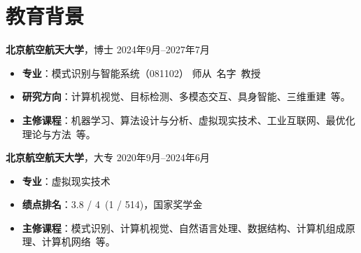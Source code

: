 \documentclass[11pt]{article}
\newlength{\iconwidth}
\begin{document}
    \begin{minipage}[t]{\textwidth}
        \begin{minipage}[t]{\textwidth}
        \section[教育背景]{\makebox[\iconwidth][c]{\color{primary_color}{\faGraduationCap}}\quad 教育背景}
                
        \vspace{0.5em}
        {\large \textbf{北京航空航天大学}}，博士 \hfill 2024年9月--2027年7月
        \begin{itemize}
            \item \textbf{专\qquad 业}：模式识别与智能系统（081102）    \hfill 师从\ 名字\ 教授
            \item \textbf{研究方向}：计算机视觉、目标检测、多模态交互、具身智能、三维重建\ 等。
            \item \textbf{主修课程}：机器学习、算法设计与分析、虚拟现实技术、工业互联网、最优化理论与方法\ 等。
        \end{itemize}
        
        \vspace{0.5em}
        {\large \textbf{北京航空航天大学}}，大专 \hfill 2020年9月--2024年6月
        
        \vspace{-0.8em} 
        \noindent\begin{minipage}[t]{0.42\linewidth}
            \begin{itemize}
                \setlength{\leftmargin}{1.em} %
                \setlength{\itemsep}{0pt}      %
                \setlength{\topsep}{0pt}       %
                \item \textbf{专\qquad 业}：虚拟现实技术
            \end{itemize}
        \end{minipage}%
        \hfill %
        \begin{minipage}[t]{0.48\linewidth}
            \begin{itemize}
                \setlength{\leftmargin}{1.2em}
                \setlength{\itemsep}{0pt}
                \setlength{\topsep}{0pt}
                \item \textbf{绩点排名}：3.8 / 4\  (1 / 514)，国家奖学金
            \end{itemize}
        \end{minipage}
        \vspace{0.5em}
        
        \begin{itemize}
            \item \textbf{主修课程}：模式识别、计算机视觉、自然语言处理、数据结构、计算机组成原理、计算机网络\ 等。
            
        \end{itemize}
        
        \vspace{1.2em}
        \end{minipage}
    \end{minipage}
\end{document}
